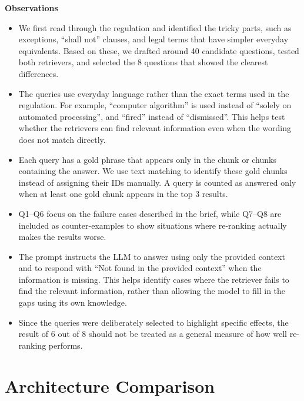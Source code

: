 \documentclass[11pt,a4paper]{article}
\newenvironment{observations}
  {\par\smallskip\noindent\textbf{Observations}\begin{itemize}}
  {\end{itemize}\smallskip}
\begin{document}
\begin{observations}
    \item We first read through the regulation and identified the tricky parts, such as exceptions, ``shall not'' clauses, and legal terms that have simpler everyday equivalents. Based on these, we drafted around 40 candidate questions, tested both retrievers, and selected the 8 questions that showed the clearest differences.

    \item The queries use everyday language rather than the exact terms used in the regulation. For example, ``computer algorithm'' is used instead of ``solely on automated processing'', and ``fired'' instead of ``dismissed''. This helps test whether the retrievers can find relevant information even when the wording does not match directly.

    \item Each query has a gold phrase that appears only in the chunk or chunks containing the answer. We use text matching to identify these gold chunks instead of assigning their IDs manually. A query is counted as answered only when at least one gold chunk appears in the top 3 results.

    \item Q1--Q6 focus on the failure cases described in the brief, while Q7--Q8 are included as counter-examples to show situations where re-ranking actually makes the results worse.

    \item The prompt instructs the LLM to answer using only the provided context and to respond with ``Not found in the provided context'' when the information is missing. This helps identify cases where the retriever fails to find the relevant information, rather than allowing the model to fill in the gaps using its own knowledge.

    \item Since the queries were deliberately selected to highlight specific effects, the result of 6 out of 8 should not be treated as a general measure of how well re-ranking performs.
\end{observations}

\section{Architecture Comparison}
\end{document}
